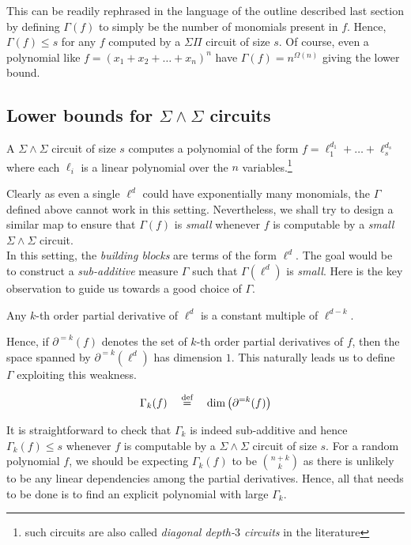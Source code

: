 \documentclass[12pt]{report}
\begin{document}
This can be readily rephrased in the language of the outline described last section by defining $\Gamma(f)$ to simply be the number of monomials present in $f$. Hence, $\Gamma(f)\leq s$ for any $f$ computed by a $\Sigma\Pi$ circuit of size $s$. Of course, even a polynomial like $f = (x_1 + x_2+\dots + x_n)^n$  have $\Gamma(f) = n^{\Omega(n)}$ giving the lower bound. 

\subsection{Lower bounds for $\Sigma\!\wedge\!\Sigma$ circuits}

A $\Sigma\!\wedge\!\Sigma$ circuit of size $s$ computes a polynomial of the form $f = \ell_1^{d_1} + \dots + \ell_s^{d_s}$ where each $\ell_i$ is a linear polynomial over the $n$ variables.\footnote{such circuits are also called \emph{diagonal depth-$3$ circuits} in the literature}

Clearly as even a single $\ell^d$ could have exponentially many monomials, the $\Gamma$ defined above cannot work in this setting. Nevertheless, we shall try to design a similar map to ensure that $\Gamma(f)$ is \emph{small} whenever $f$ is computable by a \emph{small} $\Sigma\!\wedge\!\Sigma$ circuit. \\

In this setting, the \emph{building blocks} are terms of the form $\ell^d$. The goal would be to construct a \emph{sub-additive} measure $\Gamma$ such that $\Gamma(\ell^d)$ is \emph{small}. Here is the key observation to guide us towards a good choice of $\Gamma$. 

\begin{observation}
Any $k$-th order partial derivative of $\ell^d$ is a constant multiple of $\ell^{d-k}$. 
\end{observation}

Hence, if $\partial^{=k}(f)$ denotes the set of $k$-th order partial derivatives of $f$, then the space spanned by $\partial^{=k}(\ell^d)$ has dimension $1$. This naturally leads us to define $\Gamma$ exploiting this weakness. 

$$
\Gamma_k(f)\quad \stackrel{\text{def}}{=} \quad \dim \left(\partial^{=k}(f)\right)
$$

It is straightforward to check that $\Gamma_k$ is indeed sub-additive and hence $\Gamma_k(f) \leq s$ whenever $f$ is computable by a $\Sigma\!\wedge\!\Sigma$ circuit of size $s$. For a random polynomial $f$, we should be expecting $\Gamma_k(f)$ to be $\binom{n+k}{k}$ as there is unlikely to be any linear dependencies among the partial derivatives. Hence, all that needs to be done is to find an explicit polynomial with large $\Gamma_k$. 
\end{document}
